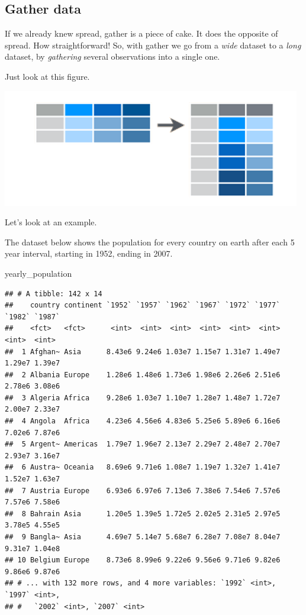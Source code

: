 \documentclass[]{tufte-book}
\newenvironment{Shaded}{}{}
\newcommand{\NormalTok}[1]{#1}
\begin{document}
\hypertarget{gather-data}{%
\subsection{Gather data}\label{gather-data}}

If we already knew spread, gather is a piece of cake. It does the opposite of spread. How straightforward! So, with gather we go from a \emph{wide} dataset to a \emph{long} dataset, by \emph{gathering} several observations into a single one.

Just look at this figure.

\includegraphics[width=1\linewidth]{images/gather}

Let's look at an example.

The dataset below shows the population for every country on earth after each 5 year interval, starting in 1952, ending in 2007.

\begin{Shaded}
\begin{Highlighting}[]
\NormalTok{yearly_population}
\end{Highlighting}
\end{Shaded}

\begin{verbatim}
## # A tibble: 142 x 14
##    country continent `1952` `1957` `1962` `1967` `1972` `1977` `1982` `1987`
##    <fct>   <fct>      <int>  <int>  <int>  <int>  <int>  <int>  <int>  <int>
##  1 Afghan~ Asia      8.43e6 9.24e6 1.03e7 1.15e7 1.31e7 1.49e7 1.29e7 1.39e7
##  2 Albania Europe    1.28e6 1.48e6 1.73e6 1.98e6 2.26e6 2.51e6 2.78e6 3.08e6
##  3 Algeria Africa    9.28e6 1.03e7 1.10e7 1.28e7 1.48e7 1.72e7 2.00e7 2.33e7
##  4 Angola  Africa    4.23e6 4.56e6 4.83e6 5.25e6 5.89e6 6.16e6 7.02e6 7.87e6
##  5 Argent~ Americas  1.79e7 1.96e7 2.13e7 2.29e7 2.48e7 2.70e7 2.93e7 3.16e7
##  6 Austra~ Oceania   8.69e6 9.71e6 1.08e7 1.19e7 1.32e7 1.41e7 1.52e7 1.63e7
##  7 Austria Europe    6.93e6 6.97e6 7.13e6 7.38e6 7.54e6 7.57e6 7.57e6 7.58e6
##  8 Bahrain Asia      1.20e5 1.39e5 1.72e5 2.02e5 2.31e5 2.97e5 3.78e5 4.55e5
##  9 Bangla~ Asia      4.69e7 5.14e7 5.68e7 6.28e7 7.08e7 8.04e7 9.31e7 1.04e8
## 10 Belgium Europe    8.73e6 8.99e6 9.22e6 9.56e6 9.71e6 9.82e6 9.86e6 9.87e6
## # ... with 132 more rows, and 4 more variables: `1992` <int>, `1997` <int>,
## #   `2002` <int>, `2007` <int>
\end{verbatim}
\end{document}
